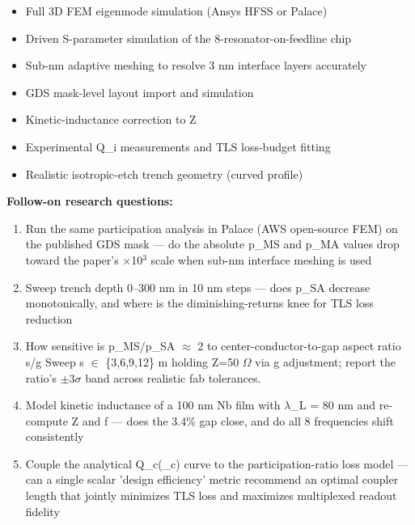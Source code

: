 \documentclass[11pt]{article}
\begin{document}
\begin{itemize}[leftmargin=1.4em,itemsep=0.2em,topsep=0.2em]
\item Full 3D FEM eigenmode simulation (Ansys HFSS or Palace)
\item Driven S-parameter simulation of the 8-resonator-on-feedline chip
\item Sub-nm adaptive meshing to resolve 3 nm interface layers accurately
\item GDS mask-level layout import and simulation
\item Kinetic-inductance correction to Z
\item Experimental Q\_i measurements and TLS loss-budget fitting
\item Realistic isotropic-etch trench geometry (curved profile)
\end{itemize}\noindent\textbf{Follow-on research questions:}
\begin{enumerate}[leftmargin=1.6em,itemsep=0.2em,topsep=0.2em,label=Q\arabic*.]
\item Run the same participation analysis in Palace (AWS open-source FEM) on the published GDS mask --- do the absolute p\_MS and p\_MA values drop toward the paper's $\times$10$^3$ scale when sub-nm interface meshing is used
\item Sweep trench depth 0--300 nm in 10 nm steps --- does p\_SA decrease monotonically, and where is the diminishing-returns knee for TLS loss reduction
\item How sensitive is p\_MS/p\_SA $\approx$ 2 to center-conductor-to-gap aspect ratio s/g Sweep s $\in$ \{3,6,9,12\} m holding Z=50 $\Omega$ via g adjustment; report the ratio's $\pm$3$\sigma$ band across realistic fab tolerances.
\item Model kinetic inductance of a 100 nm Nb film with $\lambda$\_L = 80 nm and re-compute Z and f --- does the 3.4\% gap close, and do all 8 frequencies shift consistently
\item Couple the analytical Q\_c(\_c) curve to the participation-ratio loss model --- can a single scalar 'design efficiency' metric recommend an optimal coupler length that jointly minimizes TLS loss and maximizes multiplexed readout fidelity
\end{enumerate}
\end{document}
